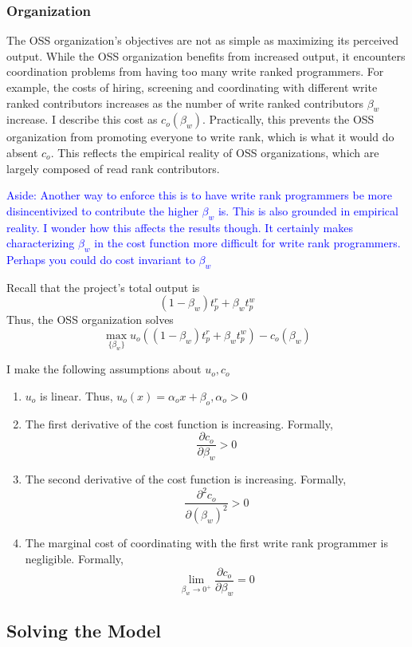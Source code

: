 \documentclass[12pt,notitlepage]{article}
\begin{document}
\subsubsection{Organization}
The OSS organization's objectives are not as simple as maximizing its perceived output. While the OSS organization benefits from increased output, it encounters coordination problems from having too many write ranked programmers. For example, the costs of hiring, screening and coordinating with different write ranked contributors increases as the number of write ranked contributors $\beta_w$ increase. I describe this cost as $c_o(\beta_w)$. Practically, this prevents the OSS organization from promoting everyone to write rank, which is what it would do absent $c_o$. This reflects the empirical reality of OSS organizations, which are largely composed of read rank contributors. 

\textcolor{blue}{Aside: Another way to enforce this is to have write rank programmers be more disincentivized to contribute the higher $\beta_w$ is. This is also grounded in empirical reality. I wonder how this affects the results though. It certainly makes characterizing $\beta_w$ in the cost function more difficult for write rank programmers. Perhaps you could do cost invariant to $\beta_w$}

\qquad Recall that the project's total output is 
$$(1-\beta_w) t_p^r + \beta_w t_p^w$$
Thus, the OSS organization solves
$$\max_{\{\beta_w\}} u_o\left((1-\beta_w) t_p^r + \beta_w t_p^w\right) - c_o(\beta_w)$$ 

I make the following assumptions about $u_o, c_o$
\begin{enumerate}
    \item $u_o$ is linear. Thus, $u_o(x) = \alpha_ox + \beta_o, \alpha_o > 0$
    \item The first derivative of the cost function is increasing. Formally, 
    $$\frac{\partial c_o}{\partial \beta_w}>0$$
    \item  The second derivative of the cost function is increasing. Formally, $$\frac{\partial^2 c_o}{\partial (\beta_w)^2}>0$$
    \item The marginal cost of coordinating with the first write rank programmer is negligible. Formally,
    $$\lim_{\beta_w \to 0^+} \frac{\partial c_o}{\partial \beta_w} = 0 $$
\end{enumerate}

\subsection{Solving the Model}
\end{document}
